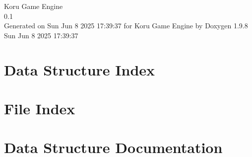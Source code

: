 \documentclass[twoside]{book}
\newcommand{\+}{\discretionary{\mbox{\scriptsize$\hookleftarrow$}}{}{}}
\newcommand{\clearemptydoublepage}{%
    \newpage{\pagestyle{empty}\cleardoublepage}%
  }
\begin{document}
  \raggedbottom
    \hypersetup{pageanchor=false,
                bookmarksnumbered=true,
                pdfencoding=unicode
               }
  \begin{titlepage}
  \vspace*{7cm}
  \begin{center}%
  {\Large Koru Game Engine}\\
  [1ex]\large 0.\+1 \\
  \vspace*{1cm}
  {\large Generated on Sun Jun 8 2025 17\+:39\+:37 for Koru Game Engine by Doxygen 1.9.8}\\
    \vspace*{0.5cm}
    {\small Sun Jun 8 2025 17:39:37}
  \end{center}
  \end{titlepage}
  \clearemptydoublepage
  \tableofcontents
  \clearemptydoublepage
  \hypersetup{pageanchor=true}

\chapter{Data Structure Index}

\chapter{File Index}

\chapter{Data Structure Documentation}


















\end{document}
